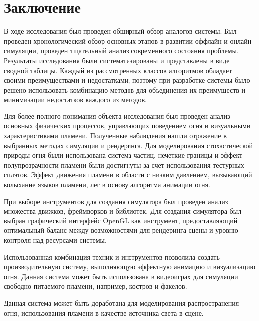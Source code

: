 \part*{Заключение}

В ходе исследования был проведен обширный обзор аналогов системы. Был проведен
хронологический обзор основных этапов в развитии оффлайн и онлайн симуляции,
проведен тщательный анализ современного состояния проблемы. Результаты
исследования были систематизированы и представлены в виде сводной таблицы.
Каждый из рассмотренных классов алгоритмов обладает своими преимуществами и недостатками,
поэтому при разработке системы было решено использовать комбинацию методов для
объединения их преимуществ и минимизации недостатков каждого из методов.

Для более полного понимания объекта исследования был проведен анализ основных
физических процессов, управляющих поведением огня и визуальными характеристиками
пламени. Полученные наблюдения нашли отражение в выбранных методах симуляции и
рендеринга. Для моделирования стохастической природы огня были использована
система частиц, нечеткие границы и эффект полупрозрачности пламени были
достигнуты за счет использования тестурных сплэтов. Эффект движения пламени в
области с низким давлением, вызывающий колыхание языков пламени, лег в основу
алгоритма анимации огня.

При выборе инструментов для создания симулятора был проведен анализ множества
движков, фреймворков и библиотек. Для создания симулятора был выбран графический
интерфейс OpenGL как инструмент, предоставляющий оптимальный баланс между
возможностями для рендеринга сцены и уровню контроля над ресурсами системы.

Использованная комбинация техник и инструментов позволила создать
производительную систему, выполняющую эффектную анимацию и визуализацию огня.
Данная система может быть использована в видеоиграх для симуляции свободно
питаемого пламени, например, костров и факелов.

Данная система может быть доработана для моделирования распространения огня,
использования пламени в качестве источника света в сцене.
